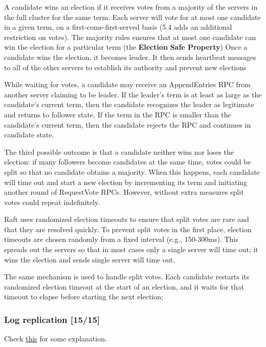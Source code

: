 \documentclass[11pt]{article}
\begin{document}
A candidate wins an election if it receives votes from a majority of the servers in the full
cluster for the same term. Each server will vote for at most one candidate in a given term, on a
first-come-first-served basis (5.4 adds an additional restriction on votes). The majority rules
ensures that at most one candidate can win the election for a particular term (the \textbf{Election}
\textbf{Safe Property}) Once a candidate wins the election, it becomes leader. It then sends heartbeat
messages to all of the other servers to establish its authority and prevent new elections

While waiting for votes, a candidate may receive an AppendEntries RPC from another server claiming
to be leader. If the leader's term is at least as large as the candidate's current term, then
the candidate recognizes the leader as legitimate and returns to follower state. If the term in
the RPC is smaller than the candidate's current term, then the candidate rejects the RPC and
continues in candidate state.

The third possible outcome is that a candidate neither wins nor loses the election: if many
followers become candidates at the same time, votes could be split so that no candidate obtains
a majority. When this happens, each candidate will time out and start a new election by
incrementing its term and initiating another round of RequestVote RPCs. However, without extra
measures split votes could repeat indefinitely.

Raft uses randomized election timeouts to ensure that split votes are rare and that they are
resolved quickly. To prevent split votes in the first place, election timeouts are chosen
randomly from a fixed interval (e.g., 150-300ms). This spreads out the servers so that in most
cases only a single server will time out; it wins the election and sends single server will time
out.

The same mechanism is used to handle split votes. Each candidate restarts its randomized
election timeout at the start of an election, and it waits for that timeout to elapse before
starting the next election;
\subsubsection{Log replication [15/15]}
\label{sec:orgc0d8fa9}

Check \href{https://stackoverflow.com/questions/46376293/what-is-lastapplied-and-matchindex-in-raft-protocol-for-volatile-state-in-server}{this} for some explanation.
\end{document}
